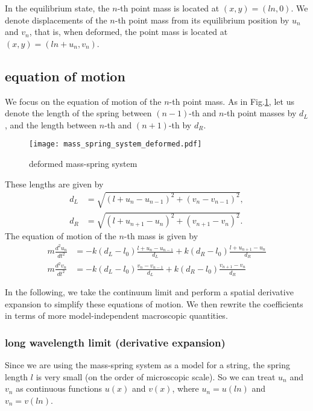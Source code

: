 \documentclass{article}
\begin{document}
In the equilibrium state, the $n$-th point mass is located at $(x,y)=(ln, 0)$.  We denote displacements of the $n$-th point mass from its equilibrium position by $u_n$ and $v_n$, that is, when deformed, the point mass is located at $(x,y)=(ln+u_n, v_n)$.

\subsection{equation of motion}
We focus on the equation of motion of the $n$-th point mass. As in Fig.\ref{fig:deformed mass-spring system}, let us denote the length of the spring between $(n-1)$-th and $n$-th point masses by $d_L$, and the length between $n$-th and $(n+1)$-th by $d_R$.  

\begin{figure}
    \centering
    \texttt{[image: mass\_spring\_system\_deformed.pdf]}
    \caption{deformed mass-spring system}
    \label{fig:deformed mass-spring system}
\end{figure}

These lengths are given by
\begin{align}
d_L &= \sqrt{(l+u_n-u_{n-1})^2+(v_n-v_{n-1})^2}, \\
d_R &= \sqrt{(l+u_{n+1}-u_n)^2+(v_{n+1}-v_n)^2}.
\end{align}
The equation of motion of the $n$-th mass is given by
\begin{align}
m\frac{d^2u_n}{dt^2} &= -k(d_L-l_0)\frac{l+u_n-u_{n-1}}{d_L} + k(d_R-l_0)\frac{l+u_{n+1}-u_n}{d_R} \label{original un equation} \\
m\frac{d^2v_n}{dt^2} &= -k(d_L-l_0)\frac{v_n-v_{n-1}}{d_L} + k(d_R-l_0)\frac{v_{n+1}-v_n}{d_R} \label{original vn equation}
\end{align}

In the following, we take the continuum limit and perform a  spatial derivative expansion to simplify these equations of motion. We then rewrite the coefficients in terms of more model-independent macroscopic quantities.  

\subsubsection{long wavelength limit (derivative expansion)}
Since we are using the mass-spring system as a model for a string, the spring length $l$ is very small (on the order of microscopic scale). So we can treat $u_n$ and $v_n$ as continuous functions $u(x)$ and $v(x)$, where $u_n=u(ln)$ and $v_n=v(ln)$.  
\end{document}
